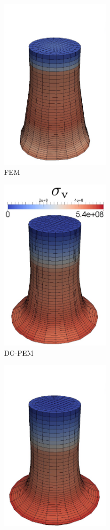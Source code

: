 \begin{figure}[!h]
  \centering
    \begin{subfigure}[b]{0.32\linewidth}
            \centering
            \includegraphics[width=2.1in]{figures/taylor_bar_fem_unmodified.pdf}
    			\caption{FEM \label{fig:taylor_bar_fem_unmodified}}
    \end{subfigure}
	\begin{subfigure}[b]{0.32\linewidth}
            \centering
            \includegraphics[width=2.1in]{figures/taylor_bar_pem_unmodified.pdf}
    			\caption{DG-PEM \label{fig:taylor_bar_pem_unmodified}}
    \end{subfigure} 
    \begin{subfigure}[b]{0.32\linewidth}
            \centering
            \includegraphics[width=2.1in]{figures/taylor_bar_fem_fbar.pdf}

\end{subfigure}
\end{figure}
